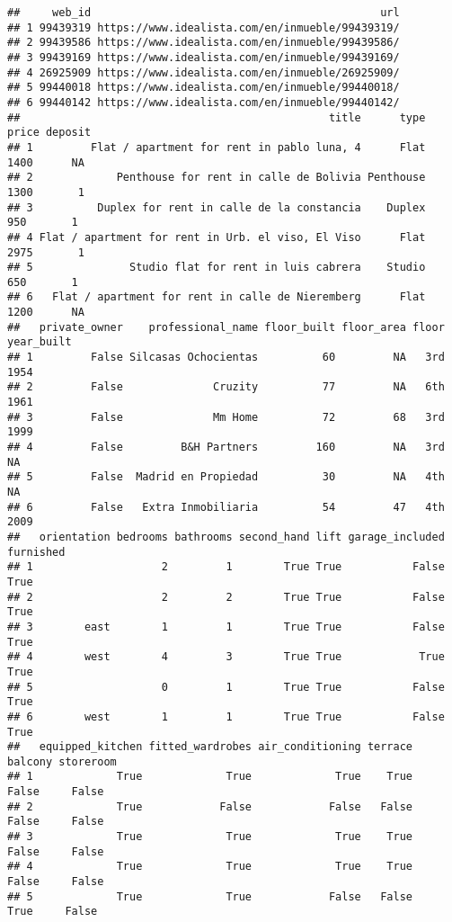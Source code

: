 \documentclass[
]{article}
\begin{document}
\begin{verbatim}
##     web_id                                             url
## 1 99439319 https://www.idealista.com/en/inmueble/99439319/
## 2 99439586 https://www.idealista.com/en/inmueble/99439586/
## 3 99439169 https://www.idealista.com/en/inmueble/99439169/
## 4 26925909 https://www.idealista.com/en/inmueble/26925909/
## 5 99440018 https://www.idealista.com/en/inmueble/99440018/
## 6 99440142 https://www.idealista.com/en/inmueble/99440142/
##                                                title      type price deposit
## 1         Flat / apartment for rent in pablo luna, 4      Flat  1400      NA
## 2             Penthouse for rent in calle de Bolivia Penthouse  1300       1
## 3          Duplex for rent in calle de la constancia    Duplex   950       1
## 4 Flat / apartment for rent in Urb. el viso, El Viso      Flat  2975       1
## 5               Studio flat for rent in luis cabrera    Studio   650       1
## 6   Flat / apartment for rent in calle de Nieremberg      Flat  1200      NA
##   private_owner    professional_name floor_built floor_area floor year_built
## 1         False Silcasas Ochocientas          60         NA   3rd       1954
## 2         False              Cruzity          77         NA   6th       1961
## 3         False              Mm Home          72         68   3rd       1999
## 4         False         B&H Partners         160         NA   3rd         NA
## 5         False  Madrid en Propiedad          30         NA   4th         NA
## 6         False   Extra Inmobiliaria          54         47   4th       2009
##   orientation bedrooms bathrooms second_hand lift garage_included furnished
## 1                    2         1        True True           False      True
## 2                    2         2        True True           False      True
## 3        east        1         1        True True           False      True
## 4        west        4         3        True True            True      True
## 5                    0         1        True True           False      True
## 6        west        1         1        True True           False      True
##   equipped_kitchen fitted_wardrobes air_conditioning terrace balcony storeroom
## 1             True             True             True    True   False     False
## 2             True            False            False   False   False     False
## 3             True             True             True    True   False     False
## 4             True             True             True    True   False     False
## 5             True             True            False   False    True     False

\end{verbatim}
\end{document}
